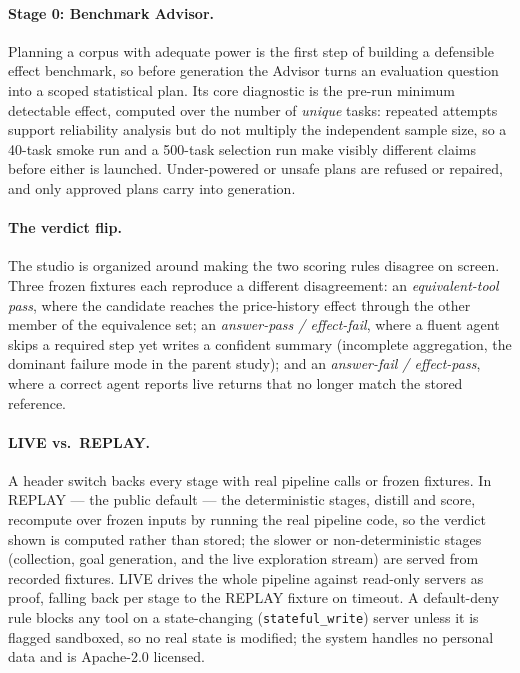 \documentclass[letterpaper]{article} %
\begin{document}
\paragraph{Stage 0: Benchmark Advisor.} Planning a corpus with adequate power is
the first step of building a defensible effect benchmark, so before generation
the Advisor turns an evaluation question into a scoped statistical plan. Its core
diagnostic is the pre-run minimum detectable effect, computed over the number of
\emph{unique} tasks: repeated attempts support reliability analysis but do not
multiply the independent sample size, so a 40-task smoke run and a 500-task
selection run make visibly different claims before either is launched.
Under-powered or unsafe plans are refused or repaired, and only approved plans
carry into generation.

\paragraph{The verdict flip.} The studio is organized around making the two
scoring rules disagree on screen. Three frozen fixtures each reproduce a
different disagreement: an \emph{equivalent-tool pass}, where the candidate
reaches the price-history effect through the other member of the equivalence set;
an \emph{answer-pass / effect-fail}, where a fluent agent skips a required step
yet writes a confident summary (incomplete aggregation, the dominant failure
mode in the parent study); and an \emph{answer-fail / effect-pass}, where a
correct agent reports live returns that no longer match the stored reference.

\paragraph{LIVE vs.\ REPLAY.} A header switch backs every stage with real
pipeline calls or frozen fixtures. In REPLAY --- the public default --- the
deterministic stages, distill and score, recompute over frozen inputs by running
the real pipeline code, so the verdict shown is computed rather than stored;
the slower or non-deterministic stages (collection, goal generation, and the
live exploration stream) are served from recorded fixtures. LIVE drives the whole
pipeline against read-only servers as proof, falling back per stage to the
REPLAY fixture on timeout. A default-deny rule blocks any tool on a
state-changing (\texttt{stateful\_write}) server unless it is flagged sandboxed,
so no real state is modified; the system handles no personal data and is
Apache-2.0 licensed.
\end{document}
